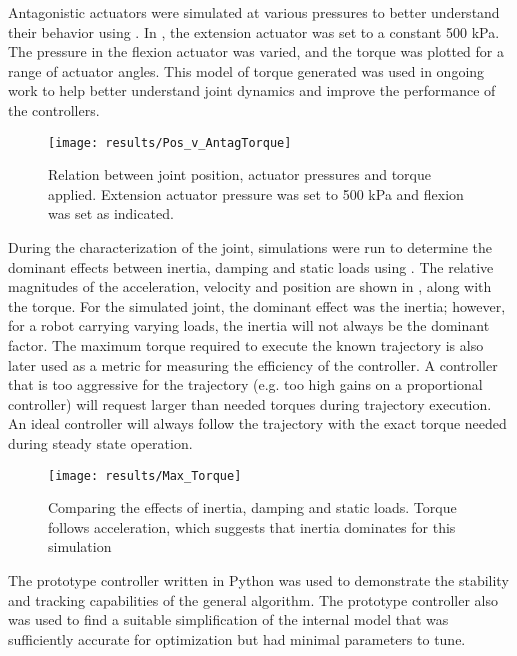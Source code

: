 
Antagonistic actuators were simulated at various pressures to better understand
their behavior using . In , the extension
actuator was set to a constant 500 kPa. The pressure in the flexion actuator was
varied, and the torque was plotted for a range of actuator angles. This model of
torque generated was used in ongoing work to help better understand joint
dynamics and improve the performance of the controllers.

\begin{figure}
\centering
\texttt{[image: results/Pos\_v\_AntagTorque]}
\caption{Relation between joint position, actuator pressures and
torque applied. Extension actuator pressure was set to 500 kPa and flexion was
set as indicated.}
\label{fig:AntagonisticPressureTorque}
\end{figure}

During the characterization of the joint, simulations were run to determine the
dominant effects between inertia, damping and static loads using . The relative 
magnitudes of the acceleration, velocity and position are shown in 
, along with the
torque. For the simulated joint, the dominant effect was the inertia; however,
for a robot carrying varying loads, the inertia will not always be the dominant factor. The 
maximum torque required to execute the known trajectory is also later used as a
metric for measuring the efficiency of the controller. A controller that is too
aggressive for the trajectory (e.g. too high gains on a proportional controller)
will request larger than needed torques during trajectory execution. An ideal
controller will always follow the trajectory with the exact torque needed during steady state operation.

\begin{figure}
\centering
\texttt{[image: results/Max\_Torque]}
\caption{Comparing the effects of inertia, damping and static loads. Torque follows acceleration, which suggests that inertia dominates for this simulation}
\label{fig:MaxTorque}
\end{figure}


The prototype controller written in Python was used to demonstrate the stability
and tracking capabilities of the general algorithm. The prototype controller also was used to find a
suitable simplification of the internal model that was sufficiently accurate for
optimization but had minimal parameters to tune.

